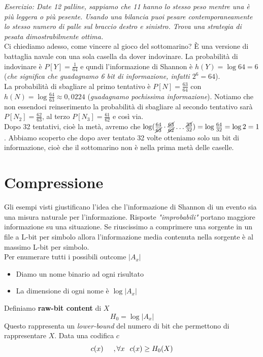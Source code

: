 \documentclass{report}
\begin{document}
\textit{Esercizio: Date 12 palline, sappiamo che 11 hanno lo stesso peso mentre una è più leggera o più pesente. Usando una bilancia puoi pesare contemporaneamente lo stesso numero di palle sul braccio destro e sinistro. Trova una strategia di pesata dimostrabilmente ottima.}
\\
Ci chiediamo adesso, come vincere al gioco del sottomarino? È una versione di battaglia navale con una sola casella da dover indovinare. La probabilità di indovinare è $P[Y]=\frac{1}{64}$ e qundi l'informazione di Shannon è $h(Y) = \log 64 = 6$ (\textit{che significa che guadagnamo 6 bit di informazione, infatti $2^6 = 64$}).
\\La probabilità di sbagliare al primo tentativo è $P[N] = \frac{63}{64}$ con $h(N)= \log \frac{64}{63} \approx 0,0224$ (\textit{guadagnamo pochissima informazione}). Notiamo che non essendoci reinserimento la probabilità di sbagliare al secondo tentativo sarà $P[N_2] = \frac{62}{63}$, al terzo $P[N_3]=\frac{61}{62}$ e così via.
\\Dopo 32 tentativi, cioè la metà, avremo che $\log(\frac{64}{\cancel{63}}\cdot \frac{\cancel{63}}{\cancel{62}} \dots \frac{\cancel{33}}{32}) = \log \frac{64}{32} = \log 2 = 1$. Abbiamo scoperto che dopo aver tentato 32 volte otteniamo solo un bit di informazione, cioè che il sottomarino non è nella prima metà delle caselle.

\section{Compressione}
Gli esempi visti giustificano l'idea che l'informazione di Shannon di un evento sia una misura naturale per l'informazione.
Risposte \textit{"improbabili"} portano maggiore informazione su una situazione. Se riuscissimo a comprimere una sorgente in un file a L-bit per simbolo allora l'informazione media contenuta  nella sorgente è al massimo  L-bit per simbolo.
\\Per enumerare tutti i possibili outcome $\left|A_x \right|$
\begin{itemize}
    \item Diamo un nome binario ad ogni risultato
    \item La dimensione di ogni nome è $\log \left|A_x \right|$
\end{itemize}
Definiamo \textbf{raw-bit content} di $X$ $$H_0 = \log \left|A_x \right| $$
Questo rappresenta un \textit{lower-bound} del numero di bit che permettono di rappresentare $X$. Data una codifica $c$
$$c(x)\hspace{0.5cm}  ,\forall x \hspace{0.25cm} c(x)\ge H_0(X)$$
\end{document}

